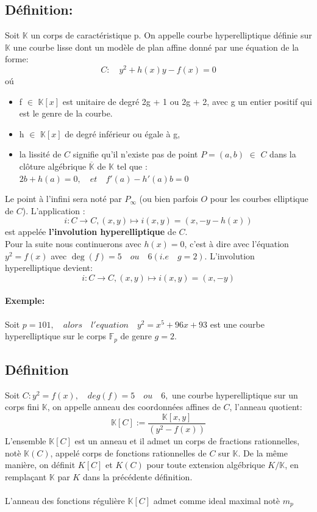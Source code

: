 \documentclass[12pt,a4paper]{article}
\begin{document}
	\subsection{Définition:}
	Soit $\mathbb{K}$ un corps de caractéristique p.
	On appelle courbe hyperelliptique définie sur $\mathbb{K}$ une courbe lisse dont un modèle de plan affine donné par une équation de la forme:
	\[
		C: \quad y^2 + h(x)y - f(x) = 0
	\]
	o\'u
		\begin{itemize}
			\item  f $\in$ $\mathbb{K}[x]$ est unitaire de degré 2g + 1 ou 2g + 2, avec g un entier positif qui est le genre de la courbe.
			\item h $\in$ $\mathbb{K}[x]$ de degré inférieur ou égale \`a g,
			\item la lissit\'e de $C$ signifie qu'il n'existe pas de point $P = (a,b)$ $\in$ $C$ dans la cl\^oture alg\'ebrique $\overline{\mathbb{K}}$ de $\mathbb{K}$ tel que : $ 2b + h(a) = 0,\quad et \quad f'(a) - h'(a)b = 0$ 
		\end{itemize}
	Le point \`a l'infini sera not\'e par $P_\infty$ (ou bien parfois $O$ pour les courbes elliptique de $C$).
	L'application : 
	\[
		i : C \rightarrow C, (x,y) \mapsto i(x,y) = (x, - y - h(x)) 
	\]
	est appelée \textbf{l'involution hyperelliptique} de $C$. \\
	Pour la suite nous continuerons avec $h(x) = 0$, c'est \`a dire avec l'\'equation $y^2 = f(x)$ avec $\deg(f)=5\quad ou\quad 6 (i.e\quad g = 2)$.
	L'involution hyperelliptique devient:
	\[
	i : C \rightarrow C, (x,y) \mapsto i(x,y) = (x, - y) 
	\]
	\paragraph{Exemple: }
	Soit $p = 101,\quad alors\quad l'equation\quad y^2 = x^5 + 96x + 93 $ est une courbe hyperelliptique sur le corps $\mathbb{F}_{p}$ de genre $g = 2$.
	\subsection{Définition}
	Soit $ C: y^2 = f(x),\quad deg(f) = 5\quad ou\quad 6,$ une courbe hyperelliptique sur un corps fini $\mathbb{K}$, on appelle anneau des coordonnées affines de $C$, l'anneau quotient:
	\[
	\mathbb{K}[C]:= \frac{\mathbb{K}[x,y]}{(y^2 - f(x))}
	\]  
	L'ensemble $\mathbb{K}[C]$ est un anneau et il admet un corps de fractions rationnelles, not\`e $\mathbb{K}(C)$, appel\'e corps de fonctions rationnelles de $C$ sur $\mathbb{K}$. De la m\^eme mani\`ere, on définit ${K}[C]$ et ${K}(C)$ pour toute extension algébrique $K/\mathbb{K}$, en remplaçant $\mathbb{K}$ par $K$ dans la précédente définition.\\ \\
	L'anneau des fonctions régulière $\mathbb{K}[C]$ admet comme ideal maximal not\`e $m_{p}$ 
\end{document}
